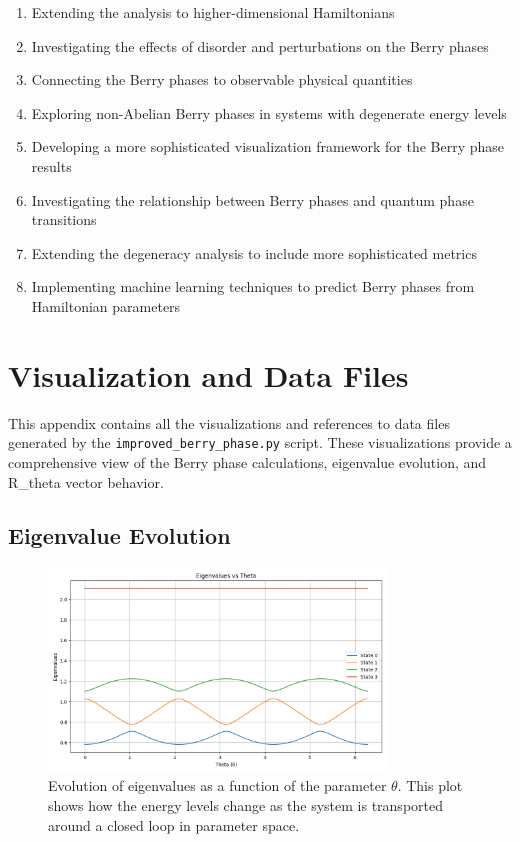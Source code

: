 \documentclass[12pt,a4paper]{article}
\begin{document}
\begin{enumerate}
    \item Extending the analysis to higher-dimensional Hamiltonians
    \item Investigating the effects of disorder and perturbations on the Berry phases
    \item Connecting the Berry phases to observable physical quantities
    \item Exploring non-Abelian Berry phases in systems with degenerate energy levels
    \item Developing a more sophisticated visualization framework for the Berry phase results
    \item Investigating the relationship between Berry phases and quantum phase transitions
    \item Extending the degeneracy analysis to include more sophisticated metrics
    \item Implementing machine learning techniques to predict Berry phases from Hamiltonian parameters
\end{enumerate}

\appendix
\section{Visualization and Data Files}\label{appendix:viz}

This appendix contains all the visualizations and references to data files generated by the \texttt{improved\_berry\_phase.py} script. These visualizations provide a comprehensive view of the Berry phase calculations, eigenvalue evolution, and R\_theta vector behavior.

\subsection{Eigenvalue Evolution}

\begin{figure}[H]
    \centering
    \includegraphics[width=0.8\textwidth]{improved_berry_phase_results/eigenvalue_evolution.png}
    \caption{Evolution of eigenvalues as a function of the parameter $\theta$. This plot shows how the energy levels change as the system is transported around a closed loop in parameter space.}
    \label{fig:eigenvalue_evolution}
\end{figure}
\end{document}
